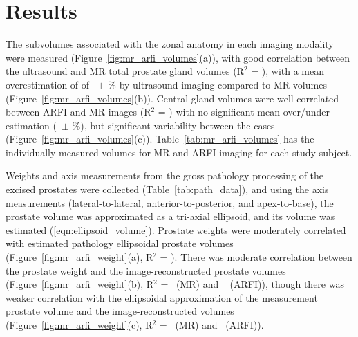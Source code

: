\section{Results}\label{sect:results}
The subvolumes associated with the zonal anatomy in each imaging modality were
measured (Figure~\ref{fig:mr_arfi_volumes}(a)), with good correlation
between the ultrasound and MR total prostate gland volumes (R$^2$ =
\MRarfiVolTotalRsq), with a mean overestimation of of
\MRarfiVolTotalMeanDiff~$\pm$ \MRarfiVolTotalStdDiff\% by ultrasound imaging compared
to MR volumes (Figure~\ref{fig:mr_arfi_volumes}(b)).  Central gland volumes
were well-correlated between ARFI and MR images (R$^2$ = \MRarfiVolCentralRsq)
with no significant mean over/under-estimation (\MRarfiVolCentralMeanDiff~$\pm$
\MRarfiVolCentralStdDiff\%), but significant variability between the cases
(Figure~\ref{fig:mr_arfi_volumes}(c)).  Table~\ref{tab:mr_arfi_volumes} has the
individually-measured volumes for MR and ARFI imaging for each study subject.



Weights and axis measurements from the gross pathology processing of the
excised prostates were collected (Table~\ref{tab:path_data}), and using the
axis measurements (lateral-to-lateral, anterior-to-posterior, and
apex-to-base), the prostate volume was approximated as a tri-axial ellipsoid,
and its volume was estimated (\ref{eqn:ellipsoid_volume}).  Prostate weights
were moderately correlated with estimated pathology ellipsoidal prostate
volumes (Figure~\ref{fig:mr_arfi_weight}(a), R$^2$ = \pathVolWeightRsq).  There
was moderate correlation between the prostate weight and the
image-reconstructed prostate volumes (Figure~\ref{fig:mr_arfi_weight}(b), R$^2$
= \weightMRrsq~(MR) and \weightARFIrsq~ (ARFI)), though there was weaker
correlation with the ellipsoidal approximation of the measurement prostate
volume and the image-reconstructed volumes (Figure~\ref{fig:mr_arfi_weight}(c),
R$^2$ = \pathVolMRrsq~(MR) and \pathVolARFIrsq~(ARFI)).  



